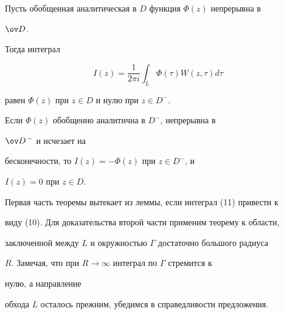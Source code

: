  


\begin{thm} 


Пусть обобщенная аналитическая в $D$ функция $\Phi(z)$ непрерывна в 


$\ov D$. 


Тогда интеграл 


\begin{equation} 


I(z)=\frac{1}{2\pi i}\int_L \Phi(\tau)W(z,\tau)d\tau 


\end{equation} 


равен $\Phi(z)$ при $z\in D$ и нулю при $z\in D^-$. 


 


Если $\Phi(z)$ обобщенно аналитична в $D^-$, непрерывна в 


$\ov D^{\,-}$ и исчезает на 


бесконечности, то $I(z)=-\Phi(z)$ при $z\in D^-$, и 


$I(z)=0$ при $z\in D$. 


\end{thm} 


 


\begin{pf} 


Первая часть теоремы вытекает из леммы, если интеграл (11) привести к 


виду (10). Для доказательства второй части применим теорему к области, 


заключенной между $L$ и окружностью $\Gamma$ достаточно большого радиуса 


$R$. Замечая, что при $R\to\infty$ интеграл по $\Gamma$ стремится к 


нулю, а направление 


обхода $L$ осталось прежним, убедимся в справедливости предложения. 


\end{pf} 


 


